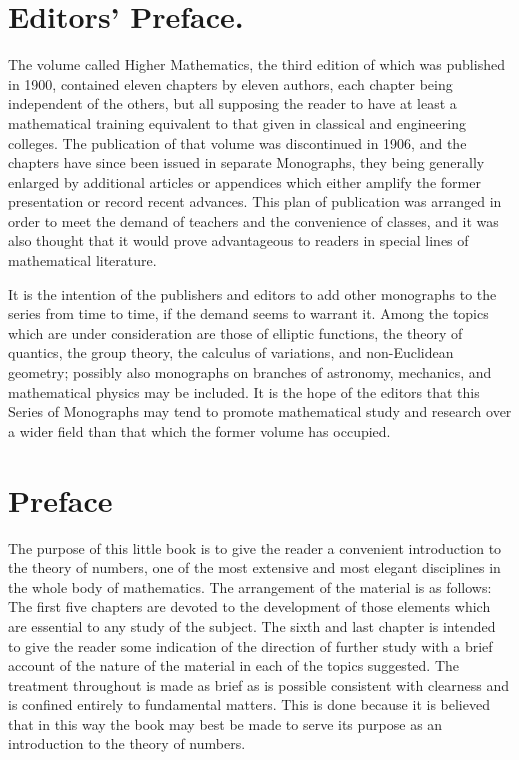\documentclass[oneside]{book}
\begin{document}
\chapter{Editors' Preface.}

The volume called Higher Mathematics, the third edition of which was
published in 1900, contained eleven chapters by eleven authors, each
chapter being independent of the others, but all supposing the
reader to have at least a mathematical training equivalent to that
given in classical and engineering colleges. The publication of that
volume was discontinued in 1906, and the chapters have since been
issued in separate Monographs, they being generally enlarged by
additional articles or appendices which either amplify the former
presentation or record recent advances. This plan of publication was
arranged in order to meet the demand of teachers and the convenience
of classes, and it was also thought that it would prove advantageous
to readers in special lines of mathematical literature.

It is the intention of the publishers and editors to add other
monographs to the series from time to time, if the demand seems to
warrant it. Among the topics which are under consideration are those
of elliptic functions, the theory of quantics, the group theory, the
calculus of variations, and non-Euclidean geometry; possibly also
monographs on branches of astronomy, mechanics, and mathematical
physics may be included. It is the hope of the editors that this
Series of Monographs may tend to promote mathematical study and
research over a wider field than that which the former volume has
occupied.

\chapter{Preface}

The purpose of this little book is to give the reader a convenient
introduction to the theory of numbers, one of the most extensive and
most elegant disciplines in the whole body of mathematics. The
arrangement of the material is as follows: The first five chapters
are devoted to the development of those elements which are essential
to any study of the subject. The sixth and last chapter is intended
to give the reader some indication of the direction of further study
with a brief account of the nature of the material in each of the
topics suggested. The treatment throughout is made as brief as is
possible consistent with clearness and is confined entirely to
fundamental matters. This is done because it is believed that in
this way the book may best be made to serve its purpose as an
introduction to the theory of numbers.
\end{document}
